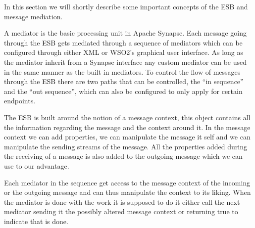     In this section we will shortly describe some important concepts of the ESB and message mediation.

    A mediator is the basic processing unit in Apache Synapse. Each message going through the ESB gets mediated through a sequence of mediators which can be configured through either XML or WSO2’s graphical user interface. As long as the mediator inherit from a Synapse interface any custom mediator can be used in the same manner as the built in mediators. To control the flow of messages through the ESB there are two paths that can be controlled, the “in sequence” and the “out sequence”, which can also be configured to only apply for certain endpoints.

    The ESB is built around the notion of a message context, this object contains all the information regarding the message and the context around it. In the message context we can add properties, we can manipulate the message it self and we can manipulate the sending streams of the message. All the properties added during the receiving of a message is also added to the outgoing message which we can use to our advantage.

    Each mediator in the sequence get access to the message context of the incoming or the outgoing message and can thus manipulate the context to its liking. When the mediator is done with the work it is supposed to do it either call the next mediator sending it the possibly altered message context or returning true to indicate that is done.

